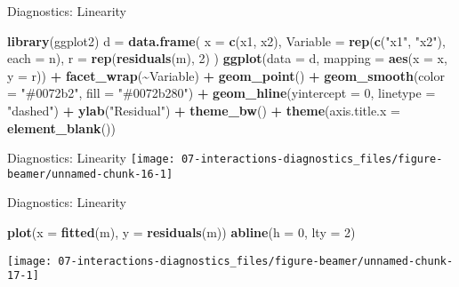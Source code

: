 \documentclass[
  ignorenonframetext,
]{beamer}
\newenvironment{Shaded}{\begin{snugshade}}{\end{snugshade}}
\newcommand{\AttributeTok}[1]{\textcolor[rgb]{0.13,0.29,0.53}{#1}}
\newcommand{\DecValTok}[1]{\textcolor[rgb]{0.00,0.00,0.81}{#1}}
\newcommand{\FunctionTok}[1]{\textcolor[rgb]{0.13,0.29,0.53}{\textbf{#1}}}
\newcommand{\NormalTok}[1]{#1}
\newcommand{\OtherTok}[1]{\textcolor[rgb]{0.56,0.35,0.01}{#1}}
\newcommand{\SpecialCharTok}[1]{\textcolor[rgb]{0.81,0.36,0.00}{\textbf{#1}}}
\newcommand{\StringTok}[1]{\textcolor[rgb]{0.31,0.60,0.02}{#1}}
\begin{document}
\begin{frame}[fragile]{Diagnostics: Linearity}
\label{diagnostics-linearity}
\pause

\begin{Shaded}
\begin{Highlighting}[]
\FunctionTok{library}\NormalTok{(ggplot2)}
\NormalTok{d }\OtherTok{=} \FunctionTok{data.frame}\NormalTok{(}
    \AttributeTok{x =} \FunctionTok{c}\NormalTok{(x1, x2),}
    \AttributeTok{Variable =} \FunctionTok{rep}\NormalTok{(}\FunctionTok{c}\NormalTok{(}\StringTok{"x1"}\NormalTok{, }\StringTok{"x2"}\NormalTok{), }\AttributeTok{each =}\NormalTok{ n),}
    \AttributeTok{r =} \FunctionTok{rep}\NormalTok{(}\FunctionTok{residuals}\NormalTok{(m), }\DecValTok{2}\NormalTok{)}
\NormalTok{)}
\FunctionTok{ggplot}\NormalTok{(}\AttributeTok{data =}\NormalTok{ d, }\AttributeTok{mapping =} \FunctionTok{aes}\NormalTok{(}\AttributeTok{x =}\NormalTok{ x, }\AttributeTok{y =}\NormalTok{ r)) }\SpecialCharTok{+}
    \FunctionTok{facet\_wrap}\NormalTok{(}\SpecialCharTok{\textasciitilde{}}\NormalTok{Variable) }\SpecialCharTok{+}
    \FunctionTok{geom\_point}\NormalTok{() }\SpecialCharTok{+}
    \FunctionTok{geom\_smooth}\NormalTok{(}\AttributeTok{color =} \StringTok{"\#0072b2"}\NormalTok{, }\AttributeTok{fill =} \StringTok{"\#0072b280"}\NormalTok{) }\SpecialCharTok{+}
    \FunctionTok{geom\_hline}\NormalTok{(}\AttributeTok{yintercept =} \DecValTok{0}\NormalTok{, }\AttributeTok{linetype =} \StringTok{"dashed"}\NormalTok{) }\SpecialCharTok{+}
    \FunctionTok{ylab}\NormalTok{(}\StringTok{"Residual"}\NormalTok{) }\SpecialCharTok{+}
    \FunctionTok{theme\_bw}\NormalTok{() }\SpecialCharTok{+}
    \FunctionTok{theme}\NormalTok{(}\AttributeTok{axis.title.x =} \FunctionTok{element\_blank}\NormalTok{())}
\end{Highlighting}
\end{Shaded}
\end{frame}

\begin{frame}{Diagnostics: Linearity}
\label{diagnostics-linearity-1}
\texttt{[image: 07-interactions-diagnostics\_files/figure-beamer/unnamed-chunk-16-1]}
\end{frame}

\begin{frame}[fragile]{Diagnostics: Linearity}
\label{diagnostics-linearity-2}
\begin{Shaded}
\begin{Highlighting}[]
\FunctionTok{plot}\NormalTok{(}\AttributeTok{x =} \FunctionTok{fitted}\NormalTok{(m), }\AttributeTok{y =} \FunctionTok{residuals}\NormalTok{(m))}
\FunctionTok{abline}\NormalTok{(}\AttributeTok{h =} \DecValTok{0}\NormalTok{, }\AttributeTok{lty =} \DecValTok{2}\NormalTok{)}
\end{Highlighting}
\end{Shaded}

\texttt{[image: 07-interactions-diagnostics\_files/figure-beamer/unnamed-chunk-17-1]}
\end{frame}
\end{document}
